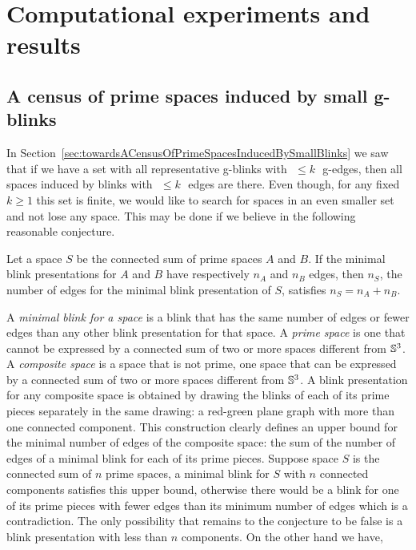 \chapter{Computational experiments and results}
\label{chap:census}

\section{A census of prime spaces induced by small g-blinks}
\label{sec:census}

\newcommand{\kpu}{\,$k$-prime-unavoidable }
\newcommand{\npu}[1]{\,$#1$-prime-unavoidable }
\newcommand{\Rk}{{\cal R}_k }
\newcommand{\Rkl}{{\cal R}'_k}

In Section~\ref{sec:towardsACensusOfPrimeSpacesInducedBySmallBlinks}
we saw that if we have a set with all representative g-blinks with
$\,\,\leq k \,\,$ g-edges, then all spaces induced by blinks with
$\,\,\leq k \,\,$ edges are there. Even though, for any fixed $k \geq
1$ this set is finite, we would like to search for spaces in an
even smaller set and not lose any space. This may be done if we
believe in the following reasonable conjecture.

\begin{Conj} \label{conj:noCompositeHasFewerEdgesThanItsMinimalPrimeSum}
Let a space $S$ be the connected sum of prime spaces $A$ and $B$.
If the minimal blink presentations for $A$ and $B$ have respectively $n_A$ and
$n_B$ edges, then $n_S$, the number of edges for the minimal blink presentation
of $S$, satisfies  $n_S = n_A + n_B$.
\end{Conj}

A {\it minimal blink for a space} is a blink that
has the same number of edges or fewer edges than any other blink
presentation for that space. A {\it prime space} is one that cannot
be expressed by a connected sum of two or more spaces
different from $\mathbb{S}^3$. A {\it composite space} is a space
that is not prime, \ie one space that can be expressed by a connected sum of
two or more spaces different from $\mathbb{S}^3$. A blink presentation for any composite space
is obtained by drawing the blinks of each of its prime pieces
separately in the same drawing: a red-green plane graph with more than one
connected component. This construction clearly defines an upper bound for
the minimal number of edges of the composite space: the sum of
the number of edges of a minimal blink for each of its
prime pieces. Suppose space $S$ is the connected sum of $n$ prime
spaces, a minimal blink for $S$ with $n$ connected
components satisfies this upper bound, otherwise there would be
a blink for one of its prime pieces with fewer edges than its minimum
number of edges which is a contradiction. The only
possibility that remains to the conjecture to be false is
a blink presentation with less than $n$ components. On the other
hand we have,

